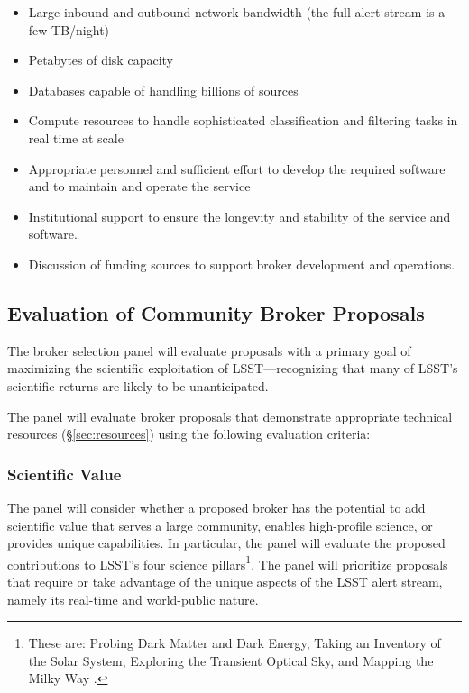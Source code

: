 \begin{itemize}
	\item Large inbound and outbound network bandwidth (the full alert stream is a few TB/night)
	\item Petabytes of disk capacity
	\item Databases capable of handling billions of sources
	\item Compute resources to handle sophisticated classification and filtering tasks in real time at scale
	\item Appropriate personnel and sufficient effort to develop the required software and to maintain and operate the service
	\item Institutional support to ensure the longevity and stability of the service and software.  
	\item Discussion of funding sources to support broker development and operations.
\end{itemize}

\subsection{Evaluation of Community Broker Proposals} \label{sec:evaluation}

The broker selection panel will evaluate proposals with a primary goal of maximizing the scientific exploitation of LSST---recognizing that many of LSST's scientific returns are likely to be unanticipated.

The panel will evaluate broker proposals that demonstrate appropriate technical resources (\S \ref{sec:resources}) using the following evaluation criteria:

\subsubsection{Scientific Value}

The panel will consider whether a proposed broker has the potential to add scientific value that serves a large community, enables high-profile science, or provides unique capabilities.
In particular, the panel will evaluate the proposed contributions to LSST's four science pillars\footnote{These are: Probing Dark Matter and Dark Energy, Taking an Inventory of the Solar System, Exploring the Transient Optical Sky, and Mapping the Milky Way .}.
The panel will prioritize proposals that require or take advantage of the unique aspects of the LSST alert stream, namely its real-time and world-public nature.

